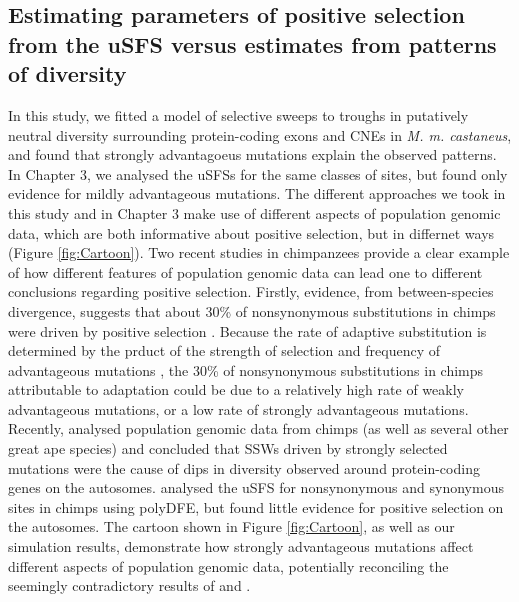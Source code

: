{\subsection{Estimating parameters of positive selection from the uSFS versus estimates from patterns of diversity}

	In this study, we fitted a model of selective sweeps to troughs in putatively neutral diversity surrounding protein-coding exons and CNEs in \textit{M. m. castaneus}, and found that strongly advantagoeus mutations explain the observed patterns. In Chapter 3, we analysed the uSFSs for the same classes of sites, but found only evidence for mildly advantageous mutations. The different approaches we took in this study and in Chapter 3 make use of different aspects of population genomic data, which are both informative about positive selection, but in differnet ways (Figure \ref{fig:Cartoon}). Two recent studies in chimpanzees provide a clear example of how different features of population genomic data can lead one to different conclusions regarding positive selection. Firstly, evidence, from between-species divergence, suggests that about 30\% of nonsynonymous substitutions in chimps were driven by positive selection \citep{RN215}. Because the rate of adaptive substitution is determined by the prduct of the strength of selection and frequency of advantageous mutations \citep{RN384}, the 30\% of nonsynonymous substitutions in chimps attributable to adaptation could be due to a relatively high rate of weakly advantageous mutations, or a low rate of strongly advantageous mutations. Recently, \cite{RN365} analysed population genomic data from chimps (as well as several other great ape species) and concluded that SSWs driven by strongly selected mutations were the cause of dips in diversity observed around protein-coding genes on the autosomes. \cite{RN354} analysed the uSFS for nonsynonymous and synonymous sites in chimps using polyDFE, but found little evidence for positive selection on the autosomes. The cartoon shown in Figure \ref{fig:Cartoon}, as well as our simulation results, demonstrate how strongly advantageous mutations affect different aspects of population genomic data, potentially reconciling the seemingly contradictory results of \cite{RN365} and \cite{RN354}. 

}
